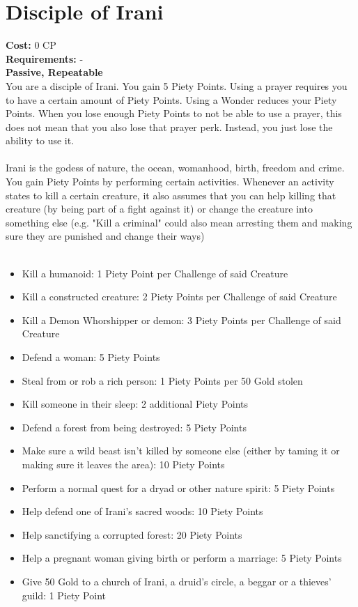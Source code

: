 \section{Disciple of Irani}
\textbf{Cost:} 0 CP\\
\textbf{Requirements:} - \\
\textbf{Passive, Repeatable}\\
You are a disciple of Irani. You gain 5 Piety Points. Using a prayer requires you to have a certain amount of Piety Points. Using a Wonder reduces your Piety Points. When you lose enough Piety Points to not be able to use a prayer, this does not mean that you also lose that prayer perk. Instead, you just lose the ability to use it.\\
\\
Irani is the godess of nature, the ocean, womanhood, birth, freedom and crime. You gain Piety Points by performing certain activities. Whenever an activity states to kill a certain creature, it also assumes that you can help killing that creature (by being part of a fight against it) or change the creature into something else (e.g. "Kill a criminal" could also mean arresting them and making sure they are punished and change their ways)\\
\\
\begin{itemize}
	\item Kill a humanoid: 1 Piety Point per Challenge of said Creature
	\item Kill a constructed creature: 2 Piety Points per Challenge of said Creature
	\item Kill a Demon Whorshipper or demon: 3 Piety Points per Challenge of said Creature
	\item Defend a woman: 5 Piety Points
	\item Steal from or rob a rich person: 1 Piety Points per 50 Gold stolen
	\item Kill someone in their sleep: 2 additional Piety Points
	\item Defend a forest from being destroyed: 5 Piety Points
	\item Make sure a wild beast isn't killed by someone else (either by taming it or making sure it leaves the area): 10 Piety Points
	\item Perform a normal quest for a dryad or other nature spirit: 5 Piety Points
	\item Help defend one of Irani's sacred woods: 10 Piety Points
	\item Help sanctifying a corrupted forest: 20 Piety Points
	\item Help a pregnant woman giving birth or perform a marriage: 5 Piety Points
	\item Give 50 Gold to a church of Irani, a druid's circle, a beggar or a thieves' guild: 1 Piety Point
\end{itemize}

